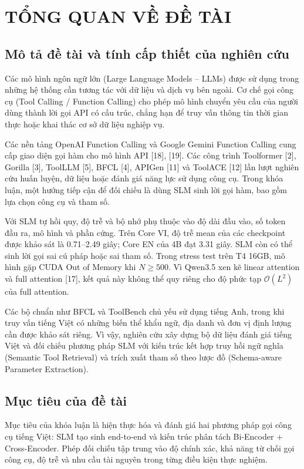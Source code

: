 \chapter{TỔNG QUAN VỀ ĐỀ TÀI}

\section{Mô tả đề tài và tính cấp thiết của nghiên cứu}
Các mô hình ngôn ngữ lớn (Large Language Models – LLMs) được sử dụng trong những hệ thống cần tương tác với dữ liệu và dịch vụ bên ngoài. Cơ chế gọi công cụ (Tool Calling / Function Calling) cho phép mô hình chuyển yêu cầu của người dùng thành lời gọi API có cấu trúc, chẳng hạn để truy vấn thông tin thời gian thực hoặc khai thác cơ sở dữ liệu nghiệp vụ.

Các nền tảng OpenAI Function Calling và Google Gemini Function Calling cung cấp giao diện gọi hàm cho mô hình API [18], [19]. Các công trình Toolformer [2], Gorilla [3], ToolLLM [5], BFCL [4], APIGen [11] và ToolACE [12] lần lượt nghiên cứu huấn luyện, dữ liệu hoặc đánh giá năng lực sử dụng công cụ. Trong khóa luận, một hướng tiếp cận để đối chiếu là dùng SLM sinh lời gọi hàm, bao gồm lựa chọn công cụ và tham số.

Với SLM tự hồi quy, độ trễ và bộ nhớ phụ thuộc vào độ dài đầu vào, số token đầu ra, mô hình và phần cứng. Trên Core VI, độ trễ mean của các checkpoint được khảo sát là 0.71–2.49 giây; Core EN của 4B đạt 3.31 giây. SLM còn có thể sinh lời gọi sai cú pháp hoặc sai tham số. Trong stress test trên T4 16GB, mô hình gặp CUDA Out of Memory khi $N \ge 500$. Vì Qwen3.5 xen kẽ linear attention và full attention [17], kết quả này không thể quy riêng cho độ phức tạp $\mathcal{O}(L^2)$ của full attention.

Các bộ chuẩn như BFCL và ToolBench chủ yếu sử dụng tiếng Anh, trong khi truy vấn tiếng Việt có những biến thể khẩu ngữ, địa danh và đơn vị định lượng cần được khảo sát riêng. Vì vậy, nghiên cứu xây dựng bộ dữ liệu đánh giá tiếng Việt và đối chiếu phương pháp SLM với kiến trúc kết hợp truy hồi ngữ nghĩa (Semantic Tool Retrieval) và trích xuất tham số theo lược đồ (Schema-aware Parameter Extraction).

\section{Mục tiêu của đề tài}
Mục tiêu của khóa luận là hiện thực hóa và đánh giá hai phương pháp gọi công cụ tiếng Việt: SLM tạo sinh end-to-end và kiến trúc phân tách Bi-Encoder + Cross-Encoder. Phép đối chiếu tập trung vào độ chính xác, khả năng từ chối gọi công cụ, độ trễ và nhu cầu tài nguyên trong từng điều kiện thực nghiệm.

